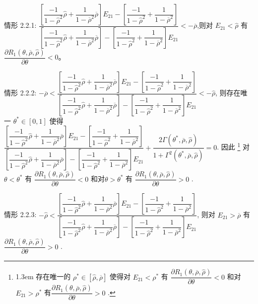 \documentclass[10.0pt]{article}
\begin{document}
情形 2.2.1: {\footnotesize $ \dfrac{\left[ \dfrac{- 1}{1 - {\hat \rho}^2} {\hat \rho} + \dfrac1{1 - \overline{\rho}^2} \overline{\rho} \right] E_{2 1} - \left[ \dfrac{- 1}{1 - {\hat \rho}^2} + \dfrac1{1 - \overline{\rho}^2} \right]}{\left[ \dfrac{- 1}{1 - {\hat \rho}^2} {\hat \rho} + \dfrac1{1 - \overline{\rho}^2} \overline{\rho} \right] - \left[ \dfrac{- 1}{1 - {\hat \rho}^2} + \dfrac1{1 - \overline{\rho}^2} \right] E_{2 1}} < - \overline{\rho} $},则对 {\footnotesize $ E_{2 1} < \hat{\rho} $} 有 {\footnotesize $ \dfrac{\partial R_1 (\theta, \overline{\rho}, {\hat \rho})}{\partial \theta} < 0 $}。

情形 2.2.2: {\footnotesize $ - \overline{\rho} < \dfrac{\left[ \dfrac{- 1}{1 - {\hat \rho}^2} {\hat \rho} + \dfrac1{1 - \overline{\rho}^2} \overline{\rho} \right] E_{2 1} - \left[ \dfrac{- 1}{1 - {\hat \rho}^2} + \dfrac1{1 - \overline{\rho}^2} \right]}{\left[ \dfrac{- 1}{1 - {\hat \rho}^2} {\hat \rho} + \dfrac1{1 - \overline{\rho}^2} \overline{\rho} \right] - \left[ \dfrac{- 1}{1 - {\hat \rho}^2} + \dfrac1{1 - \overline{\rho}^2} \right] E_{2 1}} < - \hat{\rho} $}, 则存在唯一 {\footnotesize $ \theta^* \in [0, 1] $} 使得 {\footnotesize $ \dfrac{\left[ \dfrac{- 1}{1 - {\hat \rho}^2} {\hat \rho} + \dfrac1{1 - \overline{\rho}^2} \overline{\rho} \right] E_{2 1} - \left[ \dfrac{- 1}{1 - {\hat \rho}^2} + \dfrac1{1 - \overline{\rho}^2} \right]}{\left[ \dfrac{- 1}{1 - {\hat \rho}^2} {\hat \rho} + \dfrac1{1 - \overline{\rho}^2} \overline{\rho} \right] - \left[ \dfrac{- 1}{1 - {\hat \rho}^2} + \dfrac1{1 - \overline{\rho}^2} \right] E_{2 1}} + \dfrac{2 \Gamma (\theta^*, \overline{\rho}, {\hat \rho})}{1 + \Gamma^2 (\theta^*, \overline{\rho}, {\hat \rho})} = 0 $}. 因此 \footnote{\baselineskip1.3em 存在唯一的 {\footnotesize $ \rho^* \in [\hat{\rho}, \overline{\rho}] $} 使得对 {\footnotesize $ E_{2 1} < \rho^* $} 有 {\footnotesize $ \dfrac{\partial R_1 (\theta, \overline{\rho}, {\hat \rho})}{\partial \theta} < 0 $} 和对 {\footnotesize $ E_{2 1} > \rho^* $} 有{\footnotesize $ \dfrac{\partial R_1 (\theta, \overline{\rho}, {\hat \rho})}{\partial \theta} > 0 $} .} 对 {\footnotesize $ \theta < \theta^* $} 有 {\footnotesize $ \dfrac{\partial R_1 (\theta, \overline{\rho}, {\hat \rho})}{\partial \theta} < 0 $}  和对{\footnotesize $ \theta > \theta^* $} 有 {\footnotesize $ \dfrac{\partial R_1 (\theta, \overline{\rho}, {\hat \rho})}{\partial \theta} > 0 $} .

情形 2.2.3: {\footnotesize $ - \hat{\rho} < \dfrac{\left[ \dfrac{- 1}{1 - {\hat \rho}^2} {\hat \rho} + \dfrac1{1 - \overline{\rho}^2} \overline{\rho} \right] E_{2 1} - \left[ \dfrac{- 1}{1 - {\hat \rho}^2} + \dfrac1{1 - \overline{\rho}^2} \right]}{\left[ \dfrac{- 1}{1 - {\hat \rho}^2} {\hat \rho} + \dfrac1{1 - \overline{\rho}^2} \overline{\rho} \right] - \left[ \dfrac{- 1}{1 - {\hat \rho}^2} + \dfrac1{1 - \overline{\rho}^2} \right] E_{2 1}} $}, 则对 {\footnotesize $ E_{2 1} > \overline{\rho} $} 有 {\footnotesize $ \dfrac{\partial R_1 (\theta, \overline{\rho}, {\hat \rho})}{\partial \theta} > 0 $} .
\end{document}
